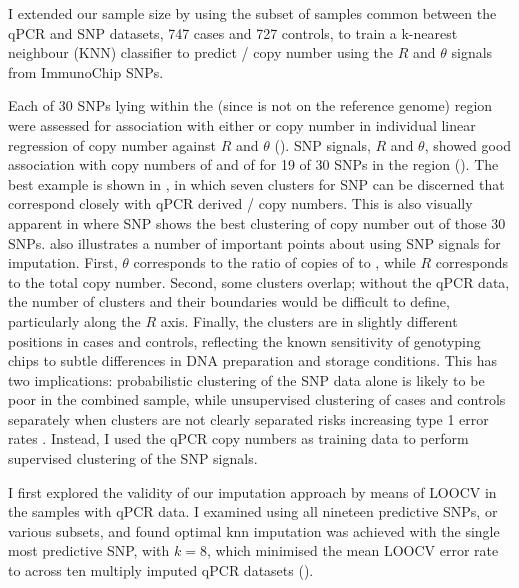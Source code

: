 I extended our sample size by using the subset of samples common between the qPCR and SNP datasets, 747 cases and 727 controls, to train a k-nearest neighbour (KNN) classifier to predict / copy number using the $R$ and $\theta$ signals from ImmunoChip SNPs.

Each of 30 SNPs lying within the  (since  is not on the reference genome) region were assessed for association with either  or  copy number in individual linear regression of copy number against $R$ and $\theta$ ().
SNP signals, $R$ and $\theta$, showed good association with copy numbers of  and of  for 19 of 30 SNPs in the  region ().
The best example is shown in , in which seven clusters for SNP  can be discerned that correspond closely with qPCR derived
/ copy numbers.
This is also visually apparent in  where SNP  shows the best clustering of copy number out of those 30 SNPs.
 also illustrates a number of important points about using SNP signals for imputation.
First, $\theta$ corresponds to the ratio of copies of  to , while $R$ corresponds to the total copy number.
Second, some clusters overlap; without the qPCR data, the number of clusters and their boundaries would be difficult to define, particularly along the $R$ axis.
Finally, the clusters are in slightly different positions in cases and controls, reflecting the known sensitivity of genotyping chips to subtle differences in DNA preparation and storage conditions.
This has two implications: probabilistic clustering of the SNP data alone is likely to be poor in the combined sample, while unsupervised clustering of cases and controls separately when clusters are not clearly separated risks increasing type 1 error rates \citep{Plagnol:2007dw}.
Instead, I used the qPCR copy numbers as training data to perform supervised clustering of the SNP signals.

I first explored the validity of our imputation approach by means of \gls{LOOCV} in the samples with qPCR data.
I examined using all nineteen predictive SNPs, or various subsets, and found optimal \gls{knn} imputation was achieved with the single most predictive SNP,
 with $k=8$, which minimised the mean \gls{LOOCV} error rate to  across ten multiply imputed qPCR datasets ().  

